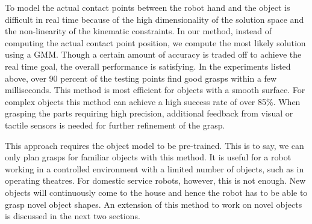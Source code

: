 To model the actual contact points between the robot hand and the object is difficult in real time because of the high dimensionality of the solution space and the non-linearity of the kinematic constraints. In our method, instead of computing the actual contact point position, we compute the most likely solution using a GMM. Though a certain amount of accuracy is traded off to achieve the real time goal, the overall performance is satisfying. In the experiments listed above, over 90 percent of the testing points find good grasps within a few milliseconds. This method is most efficient for objects with a smooth surface. For complex objects this method can achieve a high success rate of over 85\%. When grasping the parts requiring high precision, additional feedback from visual or tactile sensors is needed for further refinement of the grasp.

This approach requires the object model to be pre-trained. This is to say, we can only plan grasps for familiar objects with this method. It is useful for a robot working in a controlled environment with a limited number of objects, such as in operating theatres. For domestic service robots, however, this is not enough. New objects will continuously come to the house and hence the robot has to be able to grasp novel object shapes. An extension of this method to work on novel objects is discussed in the next two sections.



